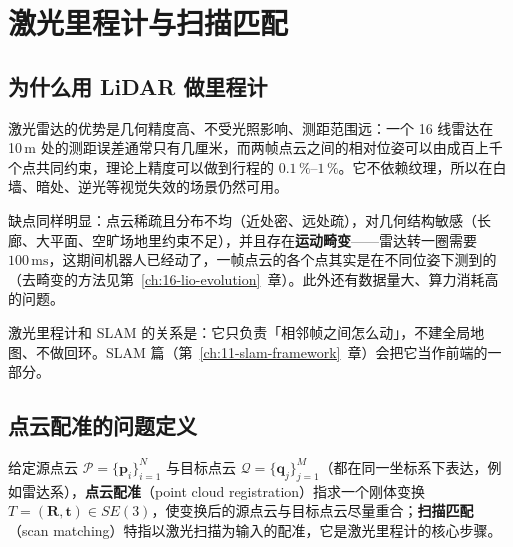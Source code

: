 ﻿\chapter{激光里程计与扫描匹配}\label{ch:07-lidar-odom}


\section{为什么用 LiDAR 做里程计}\label{sec:07-why}

激光雷达的优势是几何精度高、不受光照影响、测距范围远：一个 16 线雷达在 10\,m 处的测距误差通常只有几厘米，而两帧点云之间的相对位姿可以由成百上千个点共同约束，理论上精度可以做到行程的 $0.1\,\%$--$1\,\%$。它不依赖纹理，所以在白墙、暗处、逆光等视觉失效的场景仍然可用。

缺点同样明显：点云稀疏且分布不均（近处密、远处疏），对几何结构敏感（长廊、大平面、空旷场地里约束不足），并且存在\textbf{运动畸变}——雷达转一圈需要 $100\,\mathrm{ms}$，这期间机器人已经动了，一帧点云的各个点其实是在不同位姿下测到的（去畸变的方法见第~\ref{ch:16-lio-evolution}~章）。此外还有数据量大、算力消耗高的问题。

激光里程计和 SLAM 的关系是：它只负责「相邻帧之间怎么动」，不建全局地图、不做回环。SLAM 篇（第~\ref{ch:11-slam-framework}~章）会把它当作前端的一部分。

\section{点云配准的问题定义}\label{sec:07-registration}

\begin{definition}[扫描匹配与点云配准]
给定源点云 $\mathcal{P}=\{\bm{p}_i\}_{i=1}^{N}$ 与目标点云 $\mathcal{Q}=\{\bm{q}_j\}_{j=1}^{M}$（都在同一坐标系下表达，例如雷达系），\textbf{点云配准}（point cloud registration）指求一个刚体变换 $T=(\bm{R},\bm{t})\in SE(3)$，使变换后的源点云与目标点云尽量重合；\textbf{扫描匹配}（scan matching）特指以激光扫描为输入的配准，它是激光里程计的核心步骤。
\end{definition}

